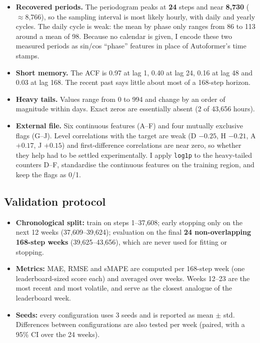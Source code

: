 \begin{itemize}
  \item \textbf{Recovered periods.} The periodogram peaks at \textbf{24} steps and near \textbf{8{,}730} ($\approx$8{,}766), so the sampling interval is most likely hourly, with daily and yearly cycles. The daily cycle is weak: the mean by phase only ranges from 86 to 113 around a mean of 98. Because no calendar is given, I encode these two measured periods as sin/cos ``phase'' features in place of Autoformer's time stamps.
  \item \textbf{Short memory.} The ACF is 0.97 at lag 1, 0.40 at lag 24, 0.16 at lag 48 and 0.03 at lag 168. The recent past says little about most of a 168-step horizon.
  \item \textbf{Heavy tails.} Values range from 0 to 994 and change by an order of magnitude within days. Exact zeros are essentially absent (2 of 43{,}656 hours).
  \item \textbf{External file.} Six continuous features (A--F) and four mutually exclusive flags (G--J). Level correlations with the target are weak (D $-0.25$, H $-0.21$, A $+0.17$, J $+0.15$) and first-difference correlations are near zero, so whether they help had to be settled experimentally. I apply \texttt{log1p} to the heavy-tailed counters D--F, standardise the continuous features on the training region, and keep the flags as 0/1.
\end{itemize}

\subsection*{Validation protocol}

\begin{itemize}
  \item \textbf{Chronological split:} train on steps 1--37{,}608; early stopping only on the next 12 weeks (37{,}609--39{,}624); evaluation on the final \textbf{24 non-overlapping 168-step weeks} (39{,}625--43{,}656), which are never used for fitting or stopping.
  \item \textbf{Metrics:} MAE, RMSE and sMAPE are computed per 168-step week (one leaderboard-sized score each) and averaged over weeks. Weeks 12--23 are the most recent and most volatile, and serve as the closest analogue of the leaderboard week.
  \item \textbf{Seeds:} every configuration uses 3 seeds and is reported as mean $\pm$ std. Differences between configurations are also tested per week (paired, with a 95\% CI over the 24 weeks).
\end{itemize}

